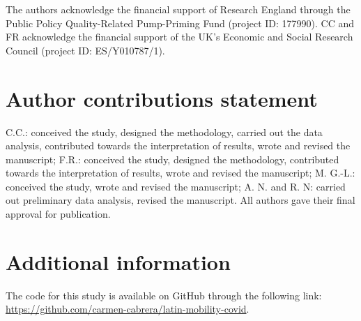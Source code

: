\documentclass[fleqn,10pt]{wlscirep}
\begin{document}
The authors acknowledge the financial support of Research England through the Public Policy Quality-Related Pump-Priming Fund (project ID: 177990). CC and FR acknowledge the financial support of the UK's Economic and Social Research Council (project ID: ES/Y010787/1).

\section*{Author contributions statement}

C.C.: conceived the study, designed the methodology, carried out the data analysis, contributed towards the interpretation of results, wrote and revised the manuscript; F.R.: conceived the study, designed the methodology, contributed towards the interpretation of results, wrote and revised the manuscript; M. G.-L.: conceived the study, wrote and revised the manuscript; A. N. and R. N: carried out preliminary data analysis, revised the manuscript. All authors gave their final approval for publication.

\section*{Additional information}

The code for this study is available on GitHub through the following link: \href{https://github.com/carmen-cabrera/latin-mobility-covid}{https://github.com/carmen-cabrera/latin-mobility-covid}.
\end{document}
